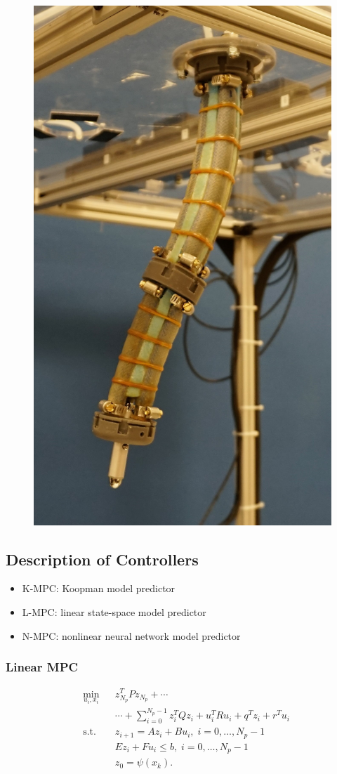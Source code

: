 \begin{figure}
    \centering
    \includegraphics[width=0.5\linewidth]{figures/closeup.jpg}
    \caption{}
    \label{fig:robot}
\end{figure}

\subsection{Description of Controllers}

\begin{itemize}
    \item K-MPC: Koopman model predictor
    \item L-MPC: linear state-space model predictor
    \item N-MPC: nonlinear neural network model predictor
\end{itemize}

\subsubsection{Linear MPC}

\begin{equation}
\begin{aligned}
& \underset{u_{i} , x_{i}}{\text{min}}
& & z_{N_p}^{T} P z_{N_p} + \cdots \\
&&& \cdots + \sum_{i=0}^{N_p - 1} z_i^T Q z_i + u_i^T R u_i + q^T z_i + r^T u_i\\
& \text{s.t.}
& & z_{i+1} = A z_i + B u_i , \; i = 0 , \ldots , N_p - 1 \\
&&& E z_i + F u_i \leq b , \; i = 0 , \ldots , N_p - 1 \\
&&& z_0 = \psi(x_k).
\end{aligned}
\end{equation}


